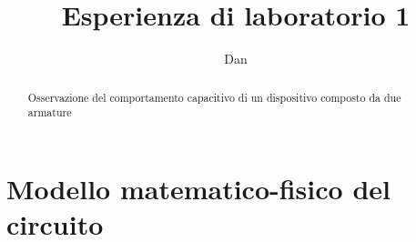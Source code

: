 \documentclass[a4paper,10pt]{article}
\title{Esperienza di laboratorio 1}
\author{Dan}
\begin{document}
\maketitle
\begin{abstract}
Osservazione del comportamento capacitivo di un dispositivo composto da due armature
\end{abstract}

\section{Modello matematico-fisico del circuito}
\end{document}

